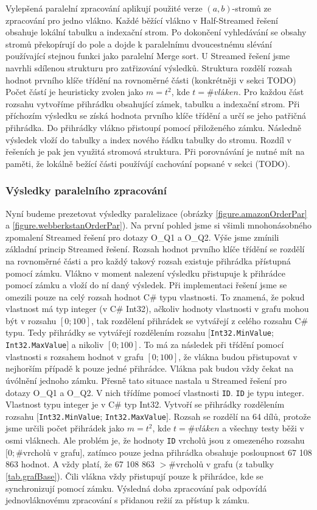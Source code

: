 Vylepšená paralelní zpracování aplikují použité verze $(a, b)$-stromů ze zpracování pro jedno vlákno. 
Každé běžící vlákno v Half-Streamed řešení obsahuje lokální tabulku a indexační strom. 
Po dokončení vyhledávání se obsahy stromů překopírují do pole a dojde k paralelnímu dvoucestnému slévání používající stejnou funkci jako paralelní Merge sort. 
U Streamed řešení jsme navrhli sdílenou strukturu pro zatřizování výsledků.
Struktura rozdělí rozsah hodnot prvního klíče třídění na rovnoměrné části (konkrétněji v sekci TODO)
Počet částí je heuristicky zvolen jako $m=t^2$, kde $t=\#vláken$. 
Pro každou část rozsahu vytvoříme přihrádku obsahující zámek, tabulku a indexační strom.
Při příchozím výsledku se získá hodnota prvního klíče třídění a určí se jeho patřičná přihrádka. 
Do přihrádky vlákno přistoupí pomocí přiloženého zámku.
Následně výsledek vloží do tabulky a index nového řádku tabulky do stromu.
Rozdíl v řešeních je pak jen využitá stromová struktura.
Při porovnávání je nutné mít na paměti, že lokálně bežící části používájí cachování popsané v sekci (TODO).  

\subsubsection{Výsledky paralelního zpracování}

Nyní budeme prezetovat výsledky paralelizace (obrázky \ref{figure.amazonOrderPar} a \ref{figure.webberkstanOrderPar}).
Na první pohled jsme si všimli mnohonásobného zpomalení Streamed řešení pro dotazy O\_Q1 a O\_Q2.
Výše jsme zmínili základní princip Streamed řešení.
Rozsah hodnot prvního klíče třídění se rozdělí na rovnoměrné části a pro každý takový rozsah existuje přihrádka přístupná pomocí zámku.
Vlákno v moment nalezení výsledku přistupuje k přihrádce pomocí zámku a vloží do ní daný výsledek.
Při implementaci řešení jsme se omezili pouze na celý rozsah hodnot C\# typu vlastnosti.
To znamená, že pokud vlastnost má typ integer (v C\# Int32), ačkoliv hodnoty vlastnosti v grafu mohou být v rozsahu $[0; 100]$, tak rozdělení přihrádek se vytvářejí z celého rozsahu C\# typu.
Tedy přihrádky se vytvářejí rozdělením rozsahu $[$\verb+Int32.MinValue+; \verb+Int32.MaxValue+$]$ a nikoliv $[0; 100]$.
To má za následek při třídění pomocí vlastnosti s rozsahem hodnot v grafu $[0; 100]$, že vlákna budou přistupovat v nejhorším případě k pouze jedné přihrádce.
Vlákna pak budou vždy čekat na úvólnění jednoho zámku.
Přesně tato situace nastala u Streamed řešení pro dotazy O\_Q1 a O\_Q2.
V nich třídíme pomocí vlastnosti \texttt{ID}. 
\texttt{ID} je typu integer.
Vlastnost typu integer je v C\# typ Int32.
Vytvoří se přihrádky rozdělením rozsahu $[$\verb+Int32.MinValue+; \verb+Int32.MaxValue+$]$.
Rozsah se rozdělí na 64 dílů, protože jsme určili počet přihrádek jako $m=t^2$, kde $t=\#vláken$ a všechny testy běži v osmi vláknech.
Ale problém je, že hodnoty \texttt{ID} vrcholů jsou z omezeného rozsahu $[0; \#$vrcholů v grafu$]$, zatímco pouze jedna přihrádka obsahuje posloupnost 67 108 863 hodnot.
A vždy platí, že 67 108 863 $> \# $vrcholů v grafu (z tabulky \ref{tab.grafBase}).
Čili vlákna vždy přistupují pouze k přihrádce, kde se synchronizují pomocí zámku. 
Výsledná doba zpracování pak odpovídá jednovláknovému zpracování s přidanou režií za přístup k zámku.


